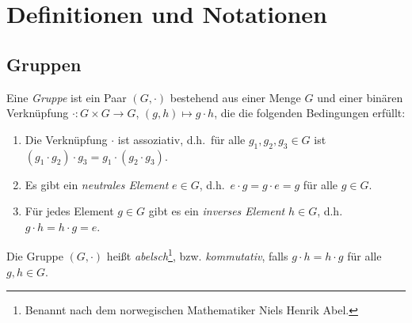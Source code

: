 \section{Definitionen und Notationen}





\subsection{Gruppen}


\begin{defi}
 Eine \emph{Gruppe} ist ein Paar $(G,\cdot)$ bestehend aus einer Menge $G$ und einer binären Verknüpfung $\cdot \colon G \times G \to G$, $(g, h) \mapsto g \cdot h$, die die folgenden Bedingungen erfüllt:
 \begin{enumerate}[label=\roman*)]
  \item
   Die Verknüpfung $\cdot$ ist assoziativ, d.h.\ für alle $g_1, g_2, g_3 \in G$ ist $(g_1 \cdot g_2) \cdot g_3 = g_1 \cdot (g_2 \cdot g_3)$.
  \item
   Es gibt ein \emph{neutrales Element} $e \in G$, d.h.\ $e \cdot g = g \cdot e = g$ für alle $g \in G$.
  \item
   Für jedes Element $g \in G$ gibt es ein \emph{inverses Element} $h \in G$, d.h.\ $g \cdot h = h \cdot g = e$.
 \end{enumerate}
 Die Gruppe $(G, \cdot)$ heißt \emph{abelsch}\footnote{Benannt nach dem norwegischen Mathematiker Niels Henrik Abel.}, bzw. \emph{kommutativ}, falls $g \cdot h = h \cdot g$ für alle $g,h \in G$.
\end{defi}


